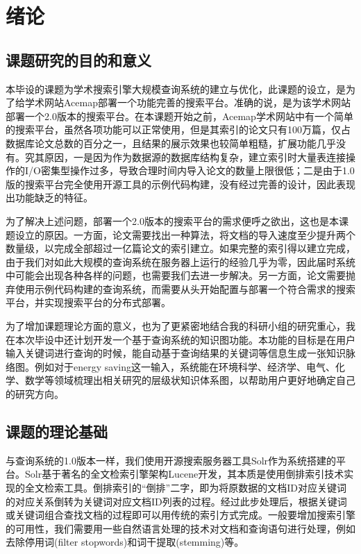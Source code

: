 
\chapter{绪论}
\label{chap:c1}

\section{课题研究的目的和意义}

本毕设的课题为学术搜索引擎大规模查询系统的建立与优化，此课题的设立，是为了给学术网站Acemap部署一个功能完善的搜索平台。准确的说，是为该学术网站部署一个2.0版本的搜索平台。在本课题开始之前，Acemap学术网站中有一个简单的搜索平台，虽然各项功能可以正常使用，但是其索引的论文只有100万篇，仅占数据库论文总数的百分之一，且结果的展示效果也较简单粗糙，扩展功能几乎没有。究其原因，一是因为作为数据源的数据库结构复杂，建立索引时大量表连接操作的I/O密集型操作过多，导致合理时间内导入论文的数量上限很低；二是由于1.0版的搜索平台完全使用开源工具的示例代码构建，没有经过完善的设计，因此表现出功能缺乏的特征。

为了解决上述问题，部署一个2.0版本的搜索平台的需求便呼之欲出，这也是本课题设立的原因。一方面，论文需要找出一种算法，将文档的导入速度至少提升两个数量级，以完成全部超过一亿篇论文的索引建立。如果完整的索引得以建立完成，由于我们对如此大规模的查询系统在服务器上运行的经验几乎为零，因此届时系统中可能会出现各种各样的问题，也需要我们去进一步解决。另一方面，论文需要抛弃使用示例代码构建的查询系统，而需要从头开始配置与部署一个符合需求的搜索平台，并实现搜索平台的分布式部署。

为了增加课题理论方面的意义，也为了更紧密地结合我的科研小组的研究重心，我在本次毕设中还计划开发一个基于查询系统的知识图功能。本功能的目标是在用户输入关键词进行查询的时候，能自动基于查询结果的关键词等信息生成一张知识脉络图。例如对于energy saving这一输入，系统能在环境科学、经济学、电气、化学、数学等领域梳理出相关研究的层级状知识体系图，以帮助用户更好地确定自己的研究方向。

\section{课题的理论基础}

与查询系统的1.0版本一样，我们使用开源搜索服务器工具Solr作为系统搭建的平台。Solr基于著名的全文检索引擎架构Lucene开发，其本质是使用倒排索引技术实现的全文检索工具。倒排索引的“倒排”二字，即为将原数据的文档ID对应关键词的对应关系倒转为关键词对应文档ID列表的过程。经过此步处理后，根据关键词或关键词组合查找文档的过程即可以用传统的索引方式完成。一般要增加搜索引擎的可用性，我们需要用一些自然语言处理的技术对文档和查询语句进行处理，例如去除停用词(filter stopwords)和词干提取(stemming)等。

